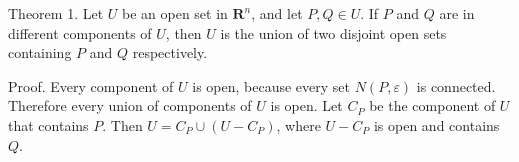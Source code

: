 Theorem 1. Let $U$ be an open set in $\mathbf{R}^{n}$, and let $P, Q \in U$. If $P$ and $Q$ are in different components of $U$, then $U$ is the union of two disjoint open sets containing $P$ and $Q$ respectively.

Proof. Every component of $U$ is open, because every set $N(P, \varepsilon)$ is connected. Therefore every union of components of $U$ is open. Let $C_{P}$ be the component of $U$ that contains $P$. Then $U=C_{P} \cup\left(U-C_{P}\right)$, where $U-C_{P}$ is open and contains $Q$.
